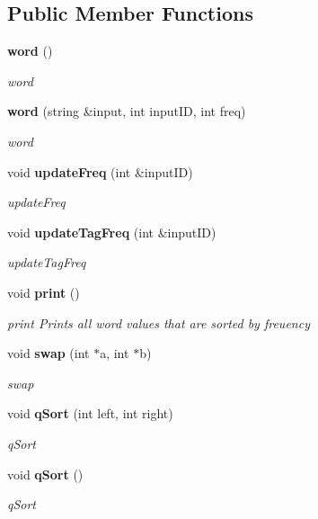 \subsection*{Public Member Functions}
\begin{DoxyCompactItemize}
\item 
{\bf word} ()\label{classword_a2a7bb6f6fcfd45d7f5137b53a97e23b8}

\begin{DoxyCompactList}\small\item\em word \end{DoxyCompactList}\item 
{\bf word} (string \&input, int input\+ID, int freq)
\begin{DoxyCompactList}\small\item\em word \end{DoxyCompactList}\item 
void {\bf update\+Freq} (int \&input\+ID)
\begin{DoxyCompactList}\small\item\em update\+Freq \end{DoxyCompactList}\item 
void {\bf update\+Tag\+Freq} (int \&input\+ID)
\begin{DoxyCompactList}\small\item\em update\+Tag\+Freq \end{DoxyCompactList}\item 
void {\bf print} ()\label{classword_a3a5f547cab6e1814ef96b39003a0c472}

\begin{DoxyCompactList}\small\item\em print Prints all word values that are sorted by freuency \end{DoxyCompactList}\item 
void {\bf swap} (int $\ast$a, int $\ast$b)
\begin{DoxyCompactList}\small\item\em swap \end{DoxyCompactList}\item 
void {\bf q\+Sort} (int left, int right)
\begin{DoxyCompactList}\small\item\em q\+Sort \end{DoxyCompactList}\item 
void {\bf q\+Sort} ()\label{classword_a4f51a299447e14954a66f2ae1492c0a7}

\begin{DoxyCompactList}\small\item\em q\+Sort \end{DoxyCompactList}\end{DoxyCompactItemize}
